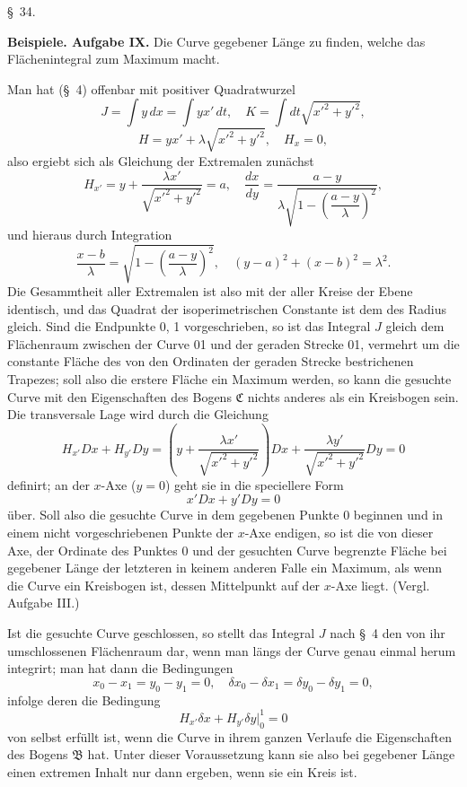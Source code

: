 \documentclass[11pt,a4paper,leqno]{article}
\begin{document}
\begin{center}{\large \S~34.}\end{center}

\noindent\textbf{Beispiele. Aufgabe IX.} Die Curve gegebener Länge zu finden, welche das Flächenintegral zum Maximum macht.

Man hat (\S~4) offenbar mit positiver Quadratwurzel
\[
J=\int y\,dx=\int yx'\,dt,
\quad
K=\int dt\sqrt{x'^2+y'^2},
\]
\[
H=yx'+\lambda\sqrt{x'^2+y'^2},
\quad
H_x=0,
\]
also ergiebt sich als Gleichung der Extremalen zunächst
\begin{equation}\tag{5}
H_{x'}=y+\frac{\lambda x'}{\sqrt{x'^2+y'^2}}=a,
\quad
\frac{dx}{dy}=\frac{a-y}{\lambda\sqrt{1-\left(\dfrac{a-y}{\lambda}\right)^2}},
\end{equation}
und hieraus durch Integration
\[
\frac{x-b}{\lambda}=\sqrt{1-\left(\frac{a-y}{\lambda}\right)^2},
\quad
(y-a)^2+(x-b)^2=\lambda^2.
\]
Die Gesammtheit aller Extremalen ist also mit der aller Kreise der Ebene identisch, und das Quadrat der isoperimetrischen Constante ist dem des Radius gleich. Sind die Endpunkte 0, 1 vorgeschrieben, so ist das Integral $J$ gleich dem Flächenraum zwischen der Curve 01 und der geraden Strecke 01, vermehrt um die constante Fläche des von den Ordinaten der geraden Strecke bestrichenen Trapezes; soll also die erstere Fläche ein Maximum werden, so kann die gesuchte Curve mit den Eigenschaften des Bogens $\mathfrak{C}$ nichts anderes als ein Kreisbogen sein. Die transversale Lage wird durch die Gleichung
\[
H_{x'}Dx+H_{y'}Dy=
\left(y+\frac{\lambda x'}{\sqrt{x'^2+y'^2}}\right)Dx+
\frac{\lambda y'}{\sqrt{x'^2+y'^2}}Dy=0
\]
definirt; an der $x$-Axe ($y=0$) geht sie in die speciellere Form
\[
x'Dx+y'Dy=0
\]
über. Soll also die gesuchte Curve in dem gegebenen Punkte 0 beginnen und in einem nicht vorgeschriebenen Punkte der $x$-Axe endigen, so ist die von dieser Axe, der Ordinate des Punktes 0 und der gesuchten Curve begrenzte Fläche bei gegebener Länge der letzteren in keinem anderen Falle ein Maximum, als wenn die Curve ein Kreisbogen ist, dessen Mittelpunkt auf der $x$-Axe liegt. (Vergl. Aufgabe III.)

Ist die gesuchte Curve geschlossen, so stellt das Integral $J$ nach \S~4 den von ihr umschlossenen Flächenraum dar, wenn man längs der Curve genau einmal herum integrirt; man hat dann die Bedingungen
\[
x_0-x_1=y_0-y_1=0,
\quad
\delta x_0-\delta x_1=\delta y_0-\delta y_1=0,
\]
infolge deren die Bedingung
\[
H_{x'}\delta x+H_{y'}\delta y\bigg|_0^1=0
\]
von selbst erfüllt ist, wenn die Curve in ihrem ganzen Verlaufe die Eigenschaften des Bogens $\mathfrak{B}$ hat. Unter dieser Voraussetzung kann sie also bei gegebener Länge einen extremen Inhalt nur dann ergeben, wenn sie ein Kreis ist.
\end{document}

